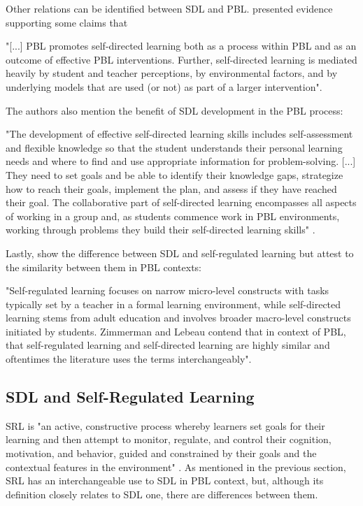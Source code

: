 Other relations can be identified between \gls{SDL} and \gls{PBL}.  presented evidence supporting some claims that
\begin{citacao}
    "[...] PBL promotes self-directed learning both as a process within PBL and as an outcome of effective PBL interventions. Further, self-directed learning is mediated heavily by student and teacher perceptions, by environmental factors, and by underlying models that are used (or not) as part of a larger intervention".
\end{citacao}
The authors also mention the benefit of \gls{SDL} development in the \gls{PBL} process:
\begin{citacao}
    "The development of effective self-directed learning skills includes self-assess\-ment and flexible knowledge so that the student understands their personal learning needs and where to find and use appropriate information for problem-solving. [...] They need to set goals and be able to identify their knowledge gaps, strategize how to reach their goals, implement the plan, and assess if they have reached their goal. The collaborative part of self-directed learning encompasses all aspects of working in a group and, as students commence work in PBL environments, working through problems they build their self-directed learning skills" \cite[p.~188]{leary:2019}.
\end{citacao}
Lastly,  show the difference between \gls{SDL} and self-regulated learning but attest to the similarity between them in \gls{PBL} contexts:
\begin{citacao}
    "Self-regulated learning focuses on narrow micro-level constructs with tasks typically set by a teacher in a formal learning environment, while self-directed learning stems from adult education and involves broader macro-level constructs initiated by students. Zimmerman and Lebeau contend that in context of PBL, that self-regulated learning and self-directed learning are highly similar and oftentimes the literature uses the terms interchangeably".
\end{citacao}


\subsection{SDL and Self-Regulated Learning}
\label{sdl-relations-ss:srl}

\gls{SRL} is "an active, constructive process whereby learners set goals for their learning and then attempt to monitor, regulate, and control their cognition, motivation, and behavior, guided and constrained by their goals and the contextual features in the environment" \cite[p.~453]{pintrich:2000}. As mentioned in the previous section, \gls{SRL} has an interchangeable use to \gls{SDL} in \gls{PBL} context, but, although its definition closely relates to \gls{SDL} one, there are differences between them.


